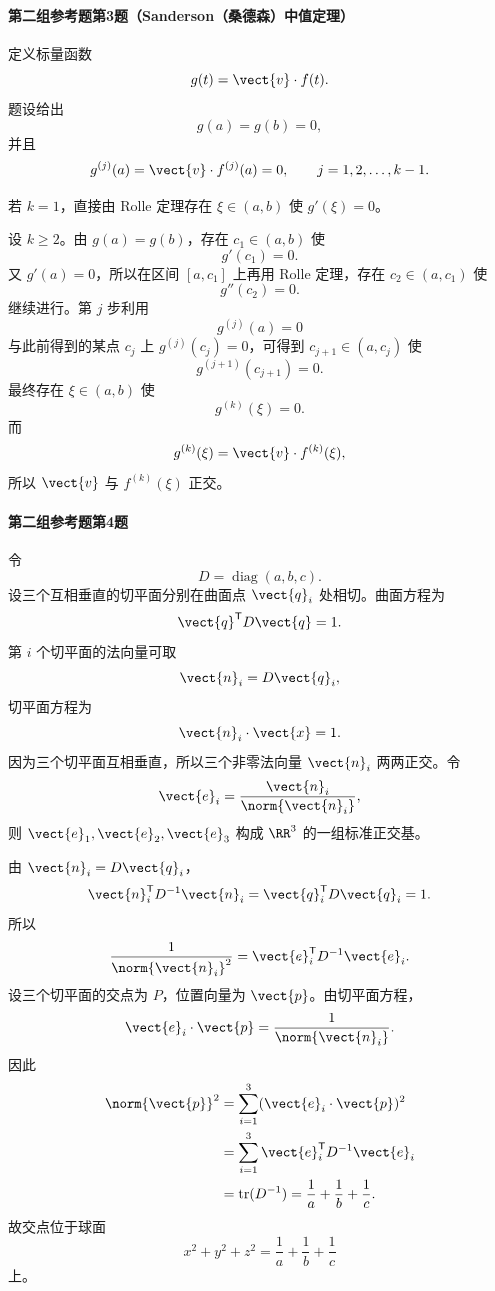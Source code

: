\paragraph{第二组参考题第3题（Sanderson（桑德森）中值定理）}
\begin{xsolution}
定义标量函数
\[
  g(t)=\vect{v}\cdot f(t).
\]
题设给出
\[
  g(a)=g(b)=0,
\]
并且
\[
  g^{(j)}(a)=\vect{v}\cdot f^{(j)}(a)=0,
  \qquad j=1,2,\ldots,k-1.
\]

若 $k=1$，直接由 Rolle 定理存在 $\xi\in(a,b)$ 使 $g'(\xi)=0$。

设 $k\ge2$。由 $g(a)=g(b)$，存在 $c_1\in(a,b)$ 使
\[
  g'(c_1)=0.
\]
又 $g'(a)=0$，所以在区间 $[a,c_1]$ 上再用 Rolle 定理，存在 $c_2\in(a,c_1)$ 使
\[
  g''(c_2)=0.
\]
继续进行。第 $j$ 步利用
\[
  g^{(j)}(a)=0
\]
与此前得到的某点 $c_j$ 上 $g^{(j)}(c_j)=0$，可得到 $c_{j+1}\in(a,c_j)$ 使
\[
  g^{(j+1)}(c_{j+1})=0.
\]
最终存在 $\xi\in(a,b)$ 使
\[
  g^{(k)}(\xi)=0.
\]
而
\[
  g^{(k)}(\xi)=\vect{v}\cdot f^{(k)}(\xi),
\]
所以 $\vect{v}$ 与 $f^{(k)}(\xi)$ 正交。
\end{xsolution}

\paragraph{第二组参考题第4题}
\begin{xsolution}
令
\[
  D=\operatorname{diag}(a,b,c).
\]
设三个互相垂直的切平面分别在曲面点 $\vect{q}_i$ 处相切。曲面方程为
\[
  \vect{q}^{\mathsf T}D\vect{q}=1.
\]
第 $i$ 个切平面的法向量可取
\[
  \vect{n}_i=D\vect{q}_i,
\]
切平面方程为
\[
  \vect{n}_i\cdot\vect{x}=1.
\]
因为三个切平面互相垂直，所以三个非零法向量 $\vect{n}_i$ 两两正交。令
\[
  \vect{e}_i=\frac{\vect{n}_i}{\norm{\vect{n}_i}},
\]
则 $\vect{e}_1,\vect{e}_2,\vect{e}_3$ 构成 $\RR^3$ 的一组标准正交基。

由 $\vect{n}_i=D\vect{q}_i$，
\[
  \vect{n}_i^{\mathsf T}D^{-1}\vect{n}_i
  =\vect{q}_i^{\mathsf T}D\vect{q}_i=1.
\]
所以
\[
  \frac1{\norm{\vect{n}_i}^2}
  =\vect{e}_i^{\mathsf T}D^{-1}\vect{e}_i.
\]
设三个切平面的交点为 $P$，位置向量为 $\vect{p}$。由切平面方程，
\[
  \vect{e}_i\cdot\vect{p}
  =\frac1{\norm{\vect{n}_i}}.
\]
因此
\[
\begin{aligned}
  \norm{\vect{p}}^2
  &=\sum_{i=1}^3(\vect{e}_i\cdot\vect{p})^2\\
  &=\sum_{i=1}^3\vect{e}_i^{\mathsf T}D^{-1}\vect{e}_i\\
  &=\operatorname{tr}(D^{-1})
  =\frac1a+\frac1b+\frac1c.
\end{aligned}
\]
故交点位于球面
\[
  x^2+y^2+z^2=\frac1a+\frac1b+\frac1c
\]
上。
\end{xsolution}

